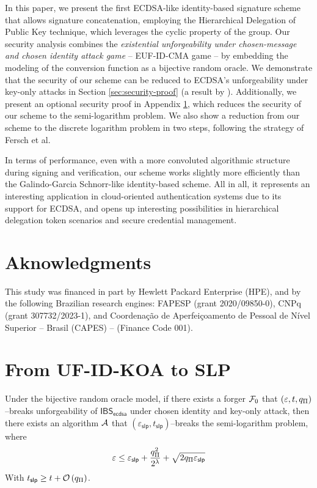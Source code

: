 \documentclass[version=submission, floatrow]{iacrcc}
\begin{document}
In this paper, we present the first ECDSA-like identity-based signature scheme that allows signature concatenation, employing the Hierarchical Delegation of Public Key technique, which leverages the cyclic property of the group. 
%
Our security analysis combines the \emph{existential unforgeability under chosen-message and chosen identity attack game} -- EUF-ID-CMA game -- by embedding the modeling of the conversion function as a bijective random oracle.
%
We demonstrate that the security of our scheme can be reduced to ECDSA's unforgeability under key-only attacks in Section \ref{sec:security-proof} (a result by \cite{CCS:FerKilPoe16}). Additionally, we present an optional security proof in Appendix \ref{appendix: ufidkoa to slp}, which reduces the security of our scheme to the semi-logarithm problem.
%
We also show a reduction from our scheme to the discrete logarithm problem in two steps, following the strategy of Fersch et al.

In terms of performance, even with a more convoluted algorithmic structure during signing and verification, our scheme works slightly more efficiently than the Galindo-Garcia Schnorr-like identity-based scheme.
%
All in all, it represents an interesting application in cloud-oriented authentication systems due to its support for ECDSA, and opens up interesting possibilities in hierarchical delegation token scenarios and secure credential management.

\section*{Aknowledgments}
This study was financed in part by Hewlett Packard Enterprise (HPE), and by the following Brazilian research engines: FAPESP (grant 2020/09850-0), CNPq (grant 307732/2023-1), and Coordenação de Aperfeiçoamento de Pessoal de Nível Superior -- Brasil (CAPES) -- (Finance Code 001).



\appendix
\section{From UF-ID-KOA to SLP}\label{appendix: ufidkoa to slp}
\begin{theorem}\label{thm:ko}
    Under the bijective random oracle model, if there exists a forger $\mathcal{F}_{0}$ that $\left(\varepsilon, t, q_{\Pi} \right)$--breaks unforgeability of $\mathsf{IBS}_{\mathsf{ecdsa}}$ under chosen identity and key-only attack, then there exists an algorithm $\mathcal{A}$ that $\left(\varepsilon_{\mathsf{slp}}, t_{\mathsf{slp}}\right)$--breaks the semi-logarithm problem, where\[
         \varepsilon \le \varepsilon_{\mathsf{slp}} + \dfrac{q_{\Pi}^{2}}{2^{\lambda}} + \sqrt{2q_{\Pi}\varepsilon_{\mathsf{slp}}}
    \]
    With $t_{\mathsf{slp}} \ge t + \mathcal{O}\left(q_{\Pi}\right)$.
\end{theorem}
\end{document}
